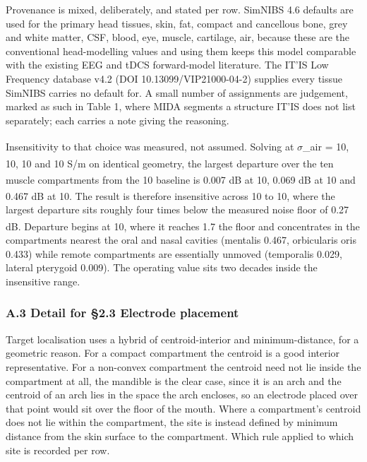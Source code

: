 \documentclass[manuscript,review,anonymous]{acmart}
\begin{document}
Provenance is mixed, deliberately, and stated per row. SimNIBS 4.6 defaults are
used for the primary head tissues, skin, fat, compact and cancellous bone, grey
and white matter, CSF, blood, eye, muscle, cartilage, air, because these are
the conventional head-modelling values and using them keeps this model
comparable with the existing EEG and tDCS forward-model literature. The IT'IS
Low Frequency database v4.2 (DOI 10.13099/VIP21000-04-2) supplies every tissue
SimNIBS carries no default for. A small number of assignments are judgement,
marked as such in Table 1, where MIDA segments a structure IT'IS does not list
separately; each carries a note giving the reasoning.

Insensitivity to that choice was measured, not assumed. Solving at
$\sigma$\_air = 10\textsuperscript{}, 10\textsuperscript{}, 10\textsuperscript{} and 10\textsuperscript{} S/m on identical geometry, the largest
departure over the ten muscle compartments from the 10\textsuperscript{} baseline is 0.007 dB at
10\textsuperscript{}, 0.069 dB at 10\textsuperscript{} and 0.467 dB at 10\textsuperscript{}. The result is therefore
insensitive across 10\textsuperscript{} to 10\textsuperscript{}, where the largest departure sits roughly four
times below the measured noise floor of 0.27 dB. Departure begins at 10\textsuperscript{}, where
it reaches 1.7\texttimes{} the floor and concentrates in the compartments nearest the oral
and nasal cavities (mentalis \textminus{}0.467, orbicularis oris \textminus{}0.433) while remote
compartments are essentially unmoved (temporalis \textminus{}0.029, lateral pterygoid
\textminus{}0.009). The operating value sits two decades inside the insensitive range.

\subsubsection{A.3 Detail for \S{}2.3 Electrode placement}\label{a.3-detail-for-2.3-electrode-placement}

Target localisation uses a hybrid of centroid-interior and minimum-distance, for
a geometric reason. For a compact compartment the centroid is a good interior
representative. For a non-convex compartment the centroid need not lie inside
the compartment at all, the mandible is the clear case, since it is an arch and
the centroid of an arch lies in the space the arch encloses, so an electrode
placed over that point would sit over the floor of the mouth. Where a
compartment's centroid does not lie within the compartment, the site is instead
defined by minimum distance from the skin surface to the compartment. Which rule
applied to which site is recorded per row.
\end{document}
